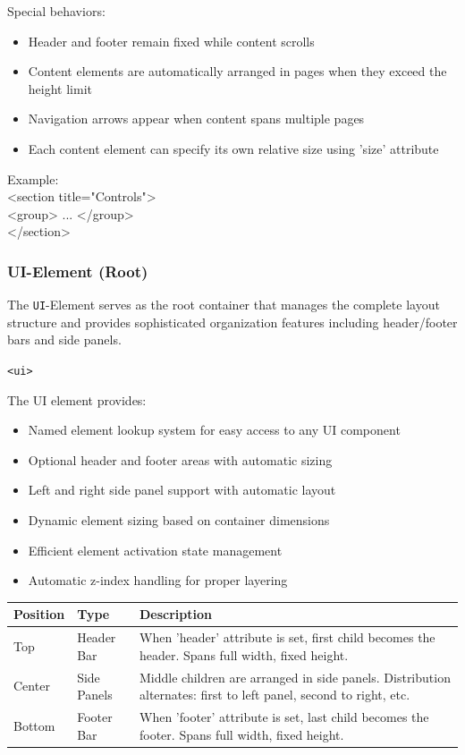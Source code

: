 \documentclass[a4paper,11pt]{article}
\begin{document}
Special behaviors:
\begin{itemize}
    \item Header and footer remain fixed while content scrolls
    \item Content elements are automatically arranged in pages when they exceed the height limit
    \item Navigation arrows appear when content spans multiple pages
    \item Each content element can specify its own relative size using 'size' attribute
\end{itemize}

Example:\\
<section title="Controls">\\
<group> ... </group>\\
</section>

\newpage
\hypertarget{ui}{}
\subsubsection*{UI-Element (Root)}
The \texttt{UI}-Element serves as the root container that manages the complete layout structure and provides sophisticated organization features including header/footer bars and side panels.
\begin{center}
    \texttt{<ui>}
\end{center}

The UI element provides:
\begin{itemize}
    \item Named element lookup system for easy access to any UI component
    \item Optional header and footer areas with automatic sizing
    \item Left and right side panel support with automatic layout
    \item Dynamic element sizing based on container dimensions
    \item Efficient element activation state management
    \item Automatic z-index handling for proper layering
\end{itemize}

\renewcommand{\arraystretch}{1.3}
\begin{tcolorbox}[colback=white, colframe=black!75, title=Child Layout]
\begin{tabularx}{\linewidth}{p{60pt}|p{110pt}|X}
	\textbf{Position} & \textbf{Type} & \textbf{Description}\\
\hline
	Top & Header Bar & When 'header' attribute is set, first child becomes the header. Spans full width, fixed height.\\
\rowcolor[HTML]{E8E8E8}
	Center & Side Panels & Middle children are arranged in side panels. Distribution alternates: first to left panel, second to right, etc.\\
	Bottom & Footer Bar & When 'footer' attribute is set, last child becomes the footer. Spans full width, fixed height.\\
\end{tabularx}
\end{tcolorbox}
\end{document}
